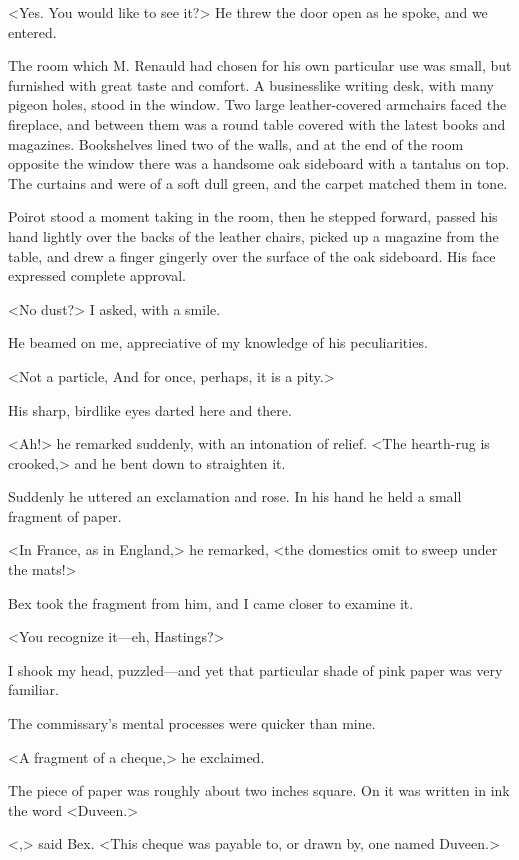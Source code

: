 <Yes. You would like to see it?> He threw the door open as he spoke, and we entered. 

 The room which M. Renauld had chosen for his own particular use was small, but furnished with great taste and comfort. A businesslike writing desk, with many pigeon holes, stood in the window. Two large leather-covered armchairs faced the fireplace, and between them was a round table covered with the latest books and magazines. Bookshelves lined two of the walls, and at the end of the room opposite the window there was a handsome oak sideboard with a tantalus on top. The curtains and  were of a soft dull green, and the carpet matched them in tone. 

 Poirot stood a moment taking in the room, then he stepped forward, passed his hand lightly over the backs of the leather chairs, picked up a magazine from the table, and drew a finger gingerly over the surface of the oak sideboard. His face expressed complete approval. 

 <No dust?> I asked, with a smile. 

 He beamed on me, appreciative of my knowledge of his peculiarities. 

 <Not a particle,  And for once, perhaps, it is a pity.> 

 His sharp, birdlike eyes darted here and there. 

 <Ah!> he remarked suddenly, with an intonation of relief. <The hearth-rug is crooked,> and he bent down to straighten it. 

 Suddenly he uttered an exclamation and rose. In his hand he held a small fragment of paper. 

 <In France, as in England,> he remarked, <the domestics omit to sweep under the mats!> 

 Bex took the fragment from him, and I came closer to examine it. 

 <You recognize it—eh, Hastings?> 

 I shook my head, puzzled—and yet that particular shade of pink paper was very familiar. 

 The commissary's mental processes were quicker than mine. 

 <A fragment of a cheque,> he exclaimed. 

 The piece of paper was roughly about two inches square. On it was written in ink the word <Duveen.> 

 <,> said Bex. <This cheque was payable to, or drawn by, one named Duveen.> 

